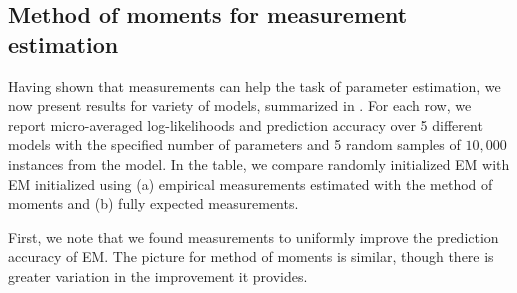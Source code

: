 

\subsection{Method of moments for measurement estimation}

Having shown that measurements can help the task of parameter estimation, we
now present results for variety of models, summarized in . 
For each row, we report micro-averaged log-likelihoods and prediction accuracy
over 5 different models with the specified number of parameters and 5 random
samples of $10,000$ instances from the model. 
In the table, we compare randomly initialized EM with EM initialized using (a)
empirical measurements estimated with the method of moments and (b) fully
expected measurements.

First, we note that we found measurements to uniformly improve the prediction
accuracy of EM. The picture for method of moments is similar, though there is
greater variation in the improvement it provides.


